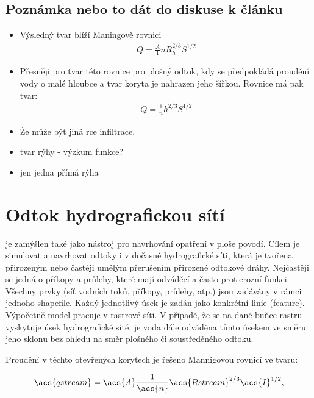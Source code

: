 \subsection{Poznámka nebo to dát do diskuse k článku} 
\begin{itemize}
\item Výsledný tvar blíží Maningově rovnici
\begin{eqnarray}
Q =\frac A {1}{n} R_{h}^{2/3} S^{1/2}
\end{eqnarray}
\item Přesněji pro tvar této rovnice pro plošný odtok, kdy se předpokládá proudění vody  o malé hloubce a tvar koryta je nahrazen jeho šířkou. Rovnice má pak tvar:
\begin{eqnarray}
Q =\frac {1}{n} h^{2/3} S^{1/2}
\end{eqnarray}
\item Že může být jiná rce infiltrace.
\item tvar rýhy - výzkum funkce?
\item jen jedna přímá rýha
\end{itemize}

\section{Odtok hydrografickou sítí} \label{sec:tokyodtok}


\smod je zamýšlen také jako nástroj pro navrhování opatření v ploše povodí. Cílem je simulovat a navrhovat odtoky i v dočasné hydrografické síti, která je tvořena přirozeným nebo častěji umělým přerušením přirozené odtokové dráhy. Nejčastěji se jedná o příkopy a průlehy, které mají odváděcí a často protierozní funkci. 
Všechny prvky (síť vodních toků, příkopy, průlehy, atp.) jsou zadávány v rámci jednoho shapefile. Každý jednotlivý úsek je zadán jako konkrétní linie (feature). Výpočetně model pracuje v rastrové síti. V případě, že se na dané buňce rastru vyskytuje úsek hydrografické sítě, je voda dále odváděna tímto úsekem ve směru jeho sklonu  bez ohledu na směr plošného či soustředěného odtoku.


Proudění v těchto otevřených korytech je řešeno Mannigovou rovnicí ve tvaru:

\begin{equation}
    \acs{qstream} = \acs{A} \frac{1}{\acs{n}} \acs{Rstream}^{2/3} \acs{I}^{1/2}  ,
    \label{eq:qtok}
\end{equation}

